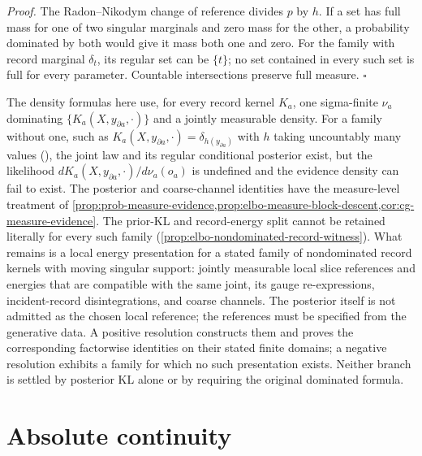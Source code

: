 \noindent\emph{Proof.}
The Radon--Nikodym change of reference divides $p$ by $h$.
If a set has full mass for one of two singular marginals and zero mass for
the other, a probability dominated by both would give it mass both one and
zero. For the family with record marginal $\delta_t$, its regular set can
be $\{t\}$; no set contained in every such set is full for every parameter.
Countable intersections preserve full measure.
\hfill$\square$

The density formulas here use, for every record kernel $K_a$, one sigma-finite $\nu_a$ dominating
$\{K_a(X,y_{\partial a},\cdot)\}$ and a jointly measurable density. For a family without one, such as
$K_a(X,y_{\partial a},\cdot)=\delta_{h(y_{\partial a})}$ with $h$ taking uncountably many values
(), the joint law and its regular conditional posterior exist, but the
likelihood $dK_a(X,y_{\partial a},\cdot)/d\nu_a(o_a)$ is undefined and the evidence density can fail to
exist. The posterior and coarse-channel identities have the
measure-level treatment of \cref{prop:prob-measure-evidence,prop:elbo-measure-block-descent,cor:cg-measure-evidence}.
The prior-KL and record-energy split cannot be retained literally for every
such family (\cref{prop:elbo-nondominated-record-witness}). What remains is
a local energy presentation for a stated family of nondominated record
kernels with moving singular support: jointly measurable local slice
references and energies that are compatible with the same joint, its gauge
re-expressions, incident-record disintegrations, and coarse channels.
The posterior itself is not admitted as the chosen local reference;
the references must be specified from the generative data.
A positive resolution constructs them and proves the corresponding
factorwise identities on their stated finite domains; a negative resolution
exhibits a family for which no such presentation exists. Neither branch is
settled by posterior KL alone or by requiring the original dominated formula.

\section{Absolute continuity}
\label{sec:prob-abscont}

